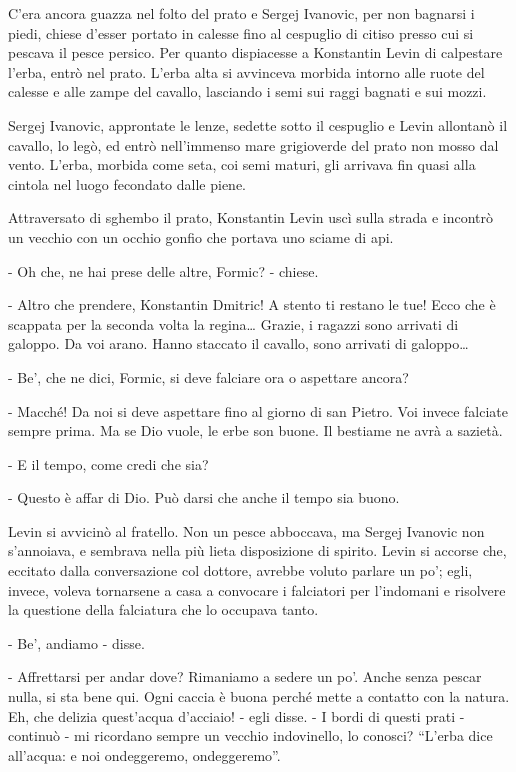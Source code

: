 C'era ancora guazza nel folto del prato e Sergej Ivanovic, per non bagnarsi i piedi, chiese d'esser portato in calesse fino al cespuglio di citiso presso cui si pescava il pesce persico. Per quanto dispiacesse a Konstantin Levin di calpestare l'erba, entrò nel prato. L'erba alta si avvinceva morbida intorno alle ruote del calesse e alle zampe del cavallo, lasciando i semi sui raggi bagnati e sui mozzi. 

Sergej Ivanovic, approntate le lenze, sedette sotto il cespuglio e Levin allontanò il cavallo, lo legò, ed entrò nell'immenso mare grigioverde del prato non mosso dal vento. L'erba, morbida come seta, coi semi maturi, gli arrivava fin quasi alla cintola nel luogo fecondato dalle piene. 

Attraversato di sghembo il prato, Konstantin Levin uscì sulla strada e incontrò un vecchio con un occhio gonfio che portava uno sciame di api. 

- Oh che, ne hai prese delle altre, Formic? - chiese. 

- Altro che prendere, Konstantin Dmitric! A stento ti restano le tue! Ecco che è scappata per la seconda volta la regina\ldots{} Grazie, i ragazzi sono arrivati di galoppo. Da voi arano. Hanno staccato il cavallo, sono arrivati di galoppo\ldots{} 

- Be', che ne dici, Formic, si deve falciare ora o aspettare ancora? 

- Macché! Da noi si deve aspettare fino al giorno di san Pietro. Voi invece falciate sempre prima. Ma se Dio vuole, le erbe son buone. Il bestiame ne avrà a sazietà. 

- E il tempo, come credi che sia? 

- Questo è affar di Dio. Può darsi che anche il tempo sia buono. 

Levin si avvicinò al fratello. Non un pesce abboccava, ma Sergej Ivanovic non s'annoiava, e sembrava nella più lieta disposizione di spirito. Levin si accorse che, eccitato dalla conversazione col dottore, avrebbe voluto parlare un po'; egli, invece, voleva tornarsene a casa a convocare i falciatori per l'indomani e risolvere la questione della falciatura che lo occupava tanto. 

- Be', andiamo - disse. 

- Affrettarsi per andar dove? Rimaniamo a sedere un po'. Anche senza pescar nulla, si sta bene qui. Ogni caccia è buona perché mette a contatto con la natura. Eh, che delizia quest'acqua d'acciaio! - egli disse. - I bordi di questi prati - continuò - mi ricordano sempre un vecchio indovinello, lo conosci? ``L'erba dice all'acqua: e noi ondeggeremo, ondeggeremo''. 

